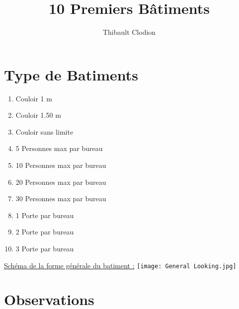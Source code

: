 \documentclass[12pt]{article}
\title{10 Premiers Bâtiments}
\author{Thibault Clodion}
\begin{document}
\maketitle %

\section{Type de Batiments}

\begin{enumerate}

\item Couloir 1 m
\item Couloir 1.50 m
\item Couloir sans limite
\item 5 Personnes max par bureau
\item 10 Personnes max par bureau
\item 20 Personnes max par bureau
\item 30 Personnes max par bureau
\item 1 Porte par bureau
\item 2 Porte par bureau 
\item 3 Porte par bureau

\end{enumerate}

\underline{Schéma de la forme générale du batiment :}\newline
\texttt{[image: General Looking.jpg]}

\section{Observations}
\end{document}
